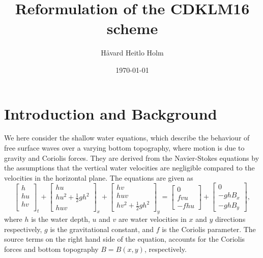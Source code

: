 \documentclass[11pt, a4paper]{article}
\begin{document}
\title{Reformulation of the CDKLM16 scheme} 
\author{H{\aa}vard Heitlo Holm}
\date{\today}

\maketitle


\section{Introduction and Background}

We here consider the shallow water equations, which describe the behaviour of free surface waves over a varying bottom topography, where motion is due to gravity and Coriolis forces.
They are derived from the Navier-Stokes equations by the assumptions that the vertical water velocities are negligible compared to the velocities in the horizontal plane.
The equations are given as 
\begin{equation}
	\left[ \begin{matrix} h \\ hu \\ hv \\ \end{matrix} \right]_t
	 + \left[ \begin{matrix} hu \\ hu^2 + \frac{1}{2} gh^2 \\ huv \end{matrix} \right]_x
	 + \left[ \begin{matrix} hv \\ huv \\ hv^2 + \frac{1}{2} gh^2 \end{matrix} \right]_y 
	 = \left[ \begin{matrix} 0 \\ fvu \\ -fhu \end{matrix} \right]
	 + \left[ \begin{matrix} 0 \\ -ghB_x \\ -ghB_y \end{matrix} \right],
	 \label{eq:swe}
\end{equation}
where $h$ is the water depth, $u$ and $v$ are water velocities in $x$ and $y$ directions respectively, $g$ is the gravitational constant, and $f$ is the Coriolis parameter.
The source terms on the right hand side of the equation, accounts for the Coriolis forces and bottom topography $B = B(x,y)$, respectively.
\end{document}
